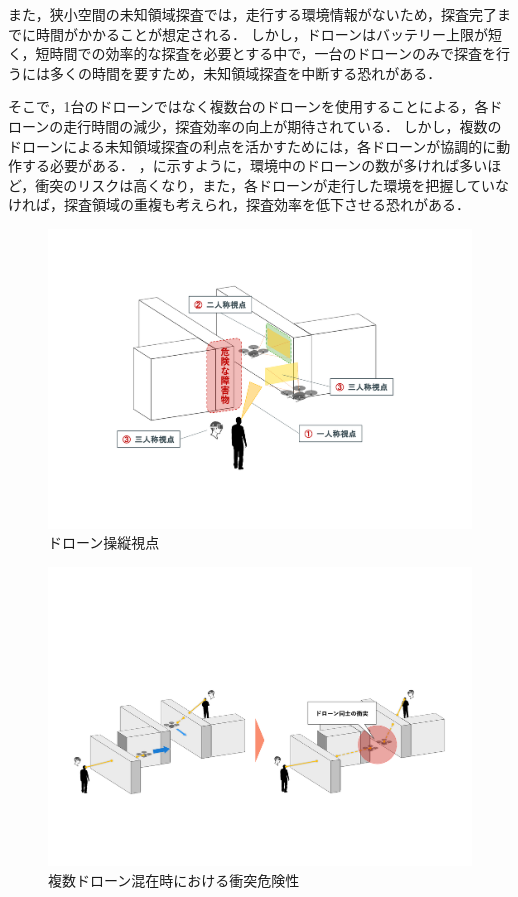 \documentclass[a4paper,11pt]{ujreport}
\begin{document}
\par
また，狭小空間の未知領域探査では，走行する環境情報がないため，探査完了までに時間がかかることが想定される\cite{book-multi01}\cite{book-multi02}．
しかし，ドローンはバッテリー上限が短く，短時間での効率的な探査を必要とする中で\cite{article-drone14}\cite{article-drone15}\cite{article-drone16}，一台のドローンのみで探査を行うには多くの時間を要すため，未知領域探査を中断する恐れがある．

そこで，1台のドローンではなく複数台のドローンを使用することによる，各ドローンの走行時間の減少，探査効率の向上が期待されている．
しかし，複数のドローンによる未知領域探査の利点を活かすためには，各ドローンが協調的に動作する必要がある．
，に示すように，環境中のドローンの数が多ければ多いほど，衝突のリスクは高くなり，また，各ドローンが走行した環境を把握していなければ，探査領域の重複も考えられ，探査効率を低下させる恐れがある．

\begin{figure}[!tb]
  \centering
  \includegraphics[width=\linewidth]{img/01_viewpoint.pdf}
  \caption{ドローン操縦視点}
  \label{fig:01_viewpoint}
\end{figure}

\begin{figure}[!tb]
  \centering
  \includegraphics[width=\linewidth]{img/01_collision.pdf}
  \caption{複数ドローン混在時における衝突危険性}
  \label{fig:01_collision}
\end{figure}
\end{document}
